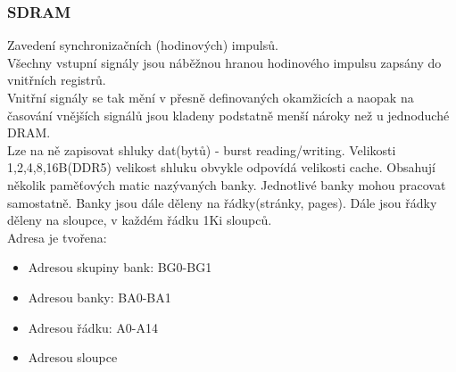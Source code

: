 \subsubsection*{SDRAM}
Zavedení synchronizačních (hodinových) impulsů.\\
Všechny vstupní signály jsou náběžnou hranou hodinového impulsu
zapsány do vnitřních registrů.\\
Vnitřní signály se tak mění v přesně definovaných okamžicích a naopak na časování vnějších signálů jsou kladeny podstatně menší nároky než u jednoduché DRAM.\\
Lze na ně zapisovat shluky dat(bytů) - burst reading/writing. Velikosti 1,2,4,8,16B(DDR5) velikost shluku obvykle odpovídá velikosti cache.
Obsahují několik paměťových matic nazývaných banky. Jednotlivé banky mohou pracovat samostatně. Banky jsou dále děleny na řádky(stránky, pages). Dále jsou řádky děleny na sloupce, v každém řádku 1Ki sloupců.\\
Adresa je tvořena:
\begin{itemize}
    \item Adresou skupiny bank: BG0-BG1
    \item Adresou banky: BA0-BA1
    \item Adresou řádku: A0-A14
    \item Adresou sloupce
\end{itemize}

